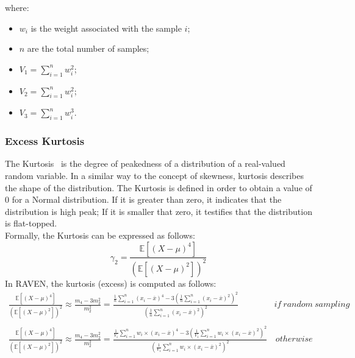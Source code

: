 where:
\begin{itemize}
  \item $w_{i}$ is the weight associated with the sample $i$;
  \item $n$ are the total number of samples;
  \item $V_{1} = \sum_{i=1}^{n} w_{i}^{2}$;
  \item $V_{2} = \sum_{i=1}^{n} w_{i}^{2}$;
  \item $V_{3} = \sum_{i=1}^{n} w_{i}^{3}$.
\end{itemize}

\subsubsection{Excess Kurtosis}
The  Kurtosis~\cite{Abramowitz}  is the degree of peakedness of a distribution of a real-valued random variable. In a similar way to the concept of skewness, kurtosis describes the shape of the distribution. The Kurtosis is defined in order to
obtain a value of $0$ for a Normal distribution. If it is greater than zero, it indicates that the distribution is high peak; If it is smaller 
that zero, it testifies that the distribution is flat-topped.
\\Formally, the Kurtosis can be expressed as follows:
\begin{equation}
\gamma_{2} = \frac{ \mathbb{E}\left [ \left ( X-\mu \right )^{4} \right ]}{\left ( \mathbb{E}\left [ \left ( X-\mu \right )^{2} \right ] \right )^{2}} 
\end{equation}
In RAVEN, the kurtosis (excess) is computed as follows:
\begin{equation}
\begin{matrix}
\frac{ \mathbb{E}\left [ \left ( X-\mu \right )^{4} \right ]}{\left ( \mathbb{E}\left [ \left ( X-\mu \right )^{2} \right ] \right )^{2}}   \approx \frac{m_{4}-3m_{2}^{2}}{m_{2}^{2}} = \displaystyle  \frac{  \frac{1}{n} \sum_{i=1}^{n}  (x_{i} - \overline{x})^{4} -3\left ( \frac{1}{n} \sum_{i=1}^{n}  (x_{i} - \overline{x})^{2} \right )^{2}}{\left ( \frac{1}{n} \sum_{i=1}^{n}  (x_{i} - \overline{x})^{2} \right )^{2}} & if \: random \: sampling  
\\
\\
\frac{ \mathbb{E}\left [ \left ( X-\mu \right )^{4} \right ]}{\left ( \mathbb{E}\left [ \left ( X-\mu \right )^{2} \right ] \right )^{2}}   \approx \frac{m_{4}-3m_{2}^{2}}{m_{2}^{2}} = \displaystyle  \frac{  \frac{1}{V_{1}} \sum_{i=1}^{n} w_{i} \times (x_{i} - \overline{x})^{4} -3\left ( \frac{1}{V_{1}} \sum_{i=1}^{n}  w_{i} \times (x_{i} - \overline{x})^{2} \right )^{2}}{\left ( \frac{1}{V_{1}} \sum_{i=1}^{n}  w_{i} \times (x_{i} - \overline{x})^{2} \right )^{2}} &  \, otherwise
\end{matrix}
\end{equation}

